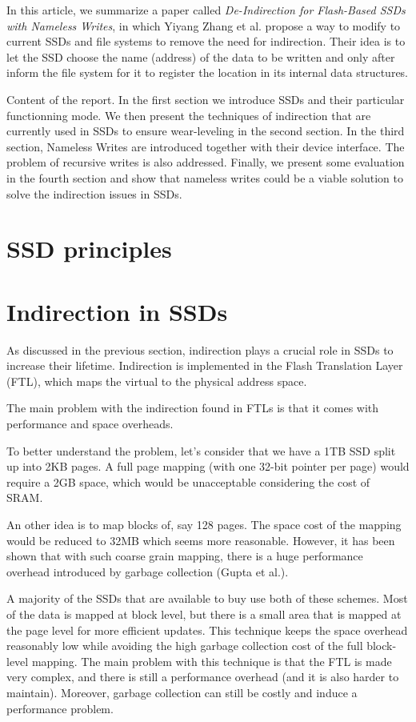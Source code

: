 \documentclass[twocolumn,a4paper,10pt]{article}
\begin{document}
In this article, we summarize a paper called \textit{De-Indirection for
	Flash-Based SSDs with Nameless Writes}, in which Yiyang Zhang et al.
propose a way to modify to current SSDs and file systems to remove the need
for indirection. Their idea is to let the SSD choose the name (address) of the
data to be written and only after inform the file system for it to register
the location in its internal data structures.

Content of the report. In the first section we introduce SSDs and their
particular functionning mode. We then present the techniques of indirection
that are currently used in SSDs to ensure wear-leveling in the second section.
In the third section, Nameless Writes are introduced together with their
device interface. The problem of recursive writes is also addressed.
Finally, we present some evaluation in the fourth section and show that
nameless writes could be a viable solution to solve the indirection issues
in SSDs.

\section*{SSD principles}

\section*{Indirection in SSDs}
As discussed in the previous section, indirection plays a crucial role in
SSDs to increase their lifetime. Indirection is implemented in the Flash
Translation Layer (FTL), which maps the virtual to the physical address space. 

The main problem with the indirection found in FTLs is that it comes with
performance and space overheads.

To better understand the problem, let's consider that we have a 1TB SSD split
up into 2KB pages. A full page mapping (with one 32-bit pointer per page)
would require a 2GB space, which would be unacceptable considering the cost
of SRAM.

An other idea is to map blocks of, say 128 pages. The space cost of the
mapping would be reduced to 32MB which seems more reasonable. However, it has
been shown that with such coarse grain mapping, there is a huge performance
overhead introduced by garbage collection (Gupta et al.).

A majority of the SSDs that are available to buy use both of these schemes.
Most of the data is mapped at block level, but there is a small area that is
mapped at the page level for more efficient updates. This technique keeps
the space overhead reasonably low while avoiding the high garbage collection
cost of the full block-level mapping. The main problem with this technique is
that the FTL is made very complex, and there is still a performance overhead
(and it is also harder to maintain). Moreover, garbage collection can still be
costly and induce a performance problem.
\end{document}

